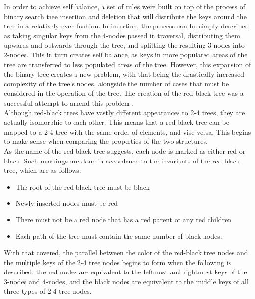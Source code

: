 \documentclass{article}
\begin{document}
\noindent
In order to achieve self balance, a set of rules were built on top of the process of binary search tree insertion and deletion that will distribute the keys around the tree in a relatively even fashion. In insertion, the process can be simply described as taking singular keys from the 4-nodes passed in traversal, distributing them upwards and outwards through the tree, and splitting the resulting 3-nodes into 2-nodes. This in turn creates self balance, as keys in more populated areas of the tree are transferred to less populated areas of the tree. However, this expansion of the binary tree creates a new problem, with that being the drastically increased complexity of the tree’s nodes, alongside the number of cases that must be considered in the operation of the tree. The creation of the red-black tree was a successful attempt to amend this problem \cite{rbtrees}.
\\

\noindent
Although red-black trees have vastly different appearances to 2-4 trees, they are actually isomorphic to each other. This means that a red-black tree can be mapped to a 2-4 tree with the same order of elements, and vise-versa. This begins to make sense when comparing the properties of the two structures.
\\

\noindent
As the name of the red-black tree suggests, each node is marked as either red or black. Such markings are done in accordance to the invariants of the red black tree, which are as follows:

\begin{itemize}
    \item The root of the red-black tree must be black
    \item Newly inserted nodes must be red
    \item There must not be a red node that has a red parent or any red children
    \item Each path of the tree must contain the same number of black nodes.
\end{itemize}

\noindent
With that covered, the parallel between the color of the red-black tree nodes and the multiple keys of the 2-4 tree nodes begins to form when the following is described: the red nodes are equivalent to the leftmost and rightmost keys of the 3-nodes and 4-nodes, and the black nodes are equivalent to the middle keys of all three types of 2-4 tree nodes. 
\\
\end{document}
